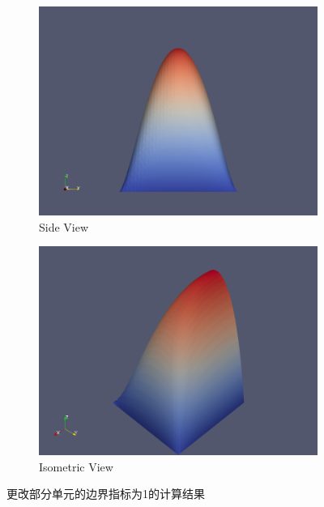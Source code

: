 \documentclass[12pt, a4paper]{article}
\numberwithin{equation}{section} %
\begin{document}
\begin{figure}[htbp]
    \vspace{1cm} %
    
    \begin{subfigure}{0.48\textwidth}
        \centering
        \includegraphics[width=\textwidth]{proj7.png}
        \caption{Side View}
        \label{fig2:side_view}
    \end{subfigure}
    \hfill
    \begin{subfigure}{0.48\textwidth}
        \centering
        \includegraphics[width=\textwidth]{proj8.png}
        \caption{Isometric View}
        \label{fig2:isometric_view}
    \end{subfigure}
    \caption{更改部分单元的边界指标为1的计算结果}
    \label{fig2:four_views}
\end{figure}
\end{document}
